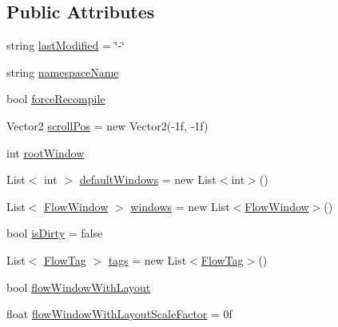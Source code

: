 \subsection*{Public Attributes}
\begin{DoxyCompactItemize}
\item 
string \hyperlink{class_unity_engine_1_1_u_i_1_1_windows_1_1_plugins_1_1_flow_1_1_flow_data_ac3b2c4cde0989b958f36dbf4977ad25e}{last\+Modified} = \char`\"{}-\/\char`\"{}
\item 
string \hyperlink{class_unity_engine_1_1_u_i_1_1_windows_1_1_plugins_1_1_flow_1_1_flow_data_a4f4cb2e635e954cc4ace108b8e1f6960}{namespace\+Name}
\item 
bool \hyperlink{class_unity_engine_1_1_u_i_1_1_windows_1_1_plugins_1_1_flow_1_1_flow_data_a48a41b22f899d612949b572244da0ae3}{force\+Recompile}
\item 
Vector2 \hyperlink{class_unity_engine_1_1_u_i_1_1_windows_1_1_plugins_1_1_flow_1_1_flow_data_a855ce6a87bb854cbeced6951daad063f}{scroll\+Pos} = new Vector2(-\/1f, -\/1f)
\item 
int \hyperlink{class_unity_engine_1_1_u_i_1_1_windows_1_1_plugins_1_1_flow_1_1_flow_data_a5c9800336aeed1455ed18ffce84ee502}{root\+Window}
\item 
List$<$ int $>$ \hyperlink{class_unity_engine_1_1_u_i_1_1_windows_1_1_plugins_1_1_flow_1_1_flow_data_ab77722d19c70ba6cfa967a6d2d7eb8d8}{default\+Windows} = new List$<$int$>$()
\item 
List$<$ \hyperlink{class_unity_engine_1_1_u_i_1_1_windows_1_1_plugins_1_1_flow_1_1_flow_window}{Flow\+Window} $>$ \hyperlink{class_unity_engine_1_1_u_i_1_1_windows_1_1_plugins_1_1_flow_1_1_flow_data_a22d28d9797622aa121040fb69909dfa6}{windows} = new List$<$\hyperlink{class_unity_engine_1_1_u_i_1_1_windows_1_1_plugins_1_1_flow_1_1_flow_window}{Flow\+Window}$>$()
\item 
bool \hyperlink{class_unity_engine_1_1_u_i_1_1_windows_1_1_plugins_1_1_flow_1_1_flow_data_a813d4bbf990d3db903e27259c1662dec}{is\+Dirty} = false
\item 
List$<$ \hyperlink{class_unity_engine_1_1_u_i_1_1_windows_1_1_plugins_1_1_flow_1_1_flow_tag}{Flow\+Tag} $>$ \hyperlink{class_unity_engine_1_1_u_i_1_1_windows_1_1_plugins_1_1_flow_1_1_flow_data_aa301622a9f41c91185af8450c5ff44c9}{tags} = new List$<$\hyperlink{class_unity_engine_1_1_u_i_1_1_windows_1_1_plugins_1_1_flow_1_1_flow_tag}{Flow\+Tag}$>$()
\item 
bool \hyperlink{class_unity_engine_1_1_u_i_1_1_windows_1_1_plugins_1_1_flow_1_1_flow_data_a1457e3979c28018672af913d465738e5}{flow\+Window\+With\+Layout}
\item 
float \hyperlink{class_unity_engine_1_1_u_i_1_1_windows_1_1_plugins_1_1_flow_1_1_flow_data_a3552eca1898bf14055a7f1a87328bb72}{flow\+Window\+With\+Layout\+Scale\+Factor} = 0f
\end{DoxyCompactItemize}


